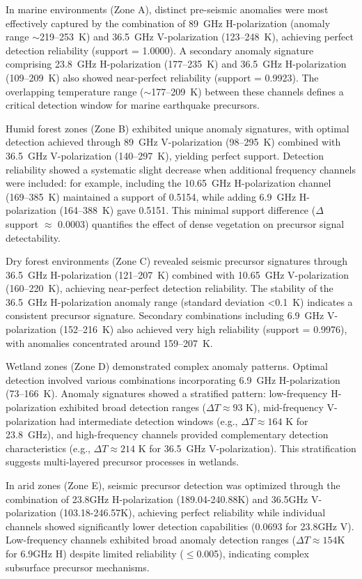 \documentclass[preprint,review,12pt,authoryear]{elsarticle}
\begin{document}
In marine environments (Zone A), distinct pre-seismic anomalies were most effectively captured by the combination of 89~GHz H-polarization (anomaly range $\sim$219--253~K) and 36.5~GHz V-polarization (123--248~K), achieving perfect detection reliability (support = 1.0000). A secondary anomaly signature comprising 23.8~GHz H-polarization (177--235~K) and 36.5~GHz H-polarization (109--209~K) also showed near-perfect reliability (support = 0.9923). The overlapping temperature range ($\sim$177--209~K) between these channels defines a critical detection window for marine earthquake precursors.

Humid forest zones (Zone B) exhibited unique anomaly signatures, with optimal detection achieved through 89~GHz V-polarization (98--295~K) combined with 36.5~GHz V-polarization (140--297~K), yielding perfect support. Detection reliability showed a systematic slight decrease when additional frequency channels were included: for example, including the 10.65~GHz H-polarization channel (169--385~K) maintained a support of 0.5154, while adding 6.9~GHz H-polarization (164--388~K) gave 0.5151. This minimal support difference ($\Delta$support $\approx$ 0.0003) quantifies the effect of dense vegetation on precursor signal detectability.

Dry forest environments (Zone C) revealed seismic precursor signatures through 36.5~GHz H-polarization (121--207~K) combined with 10.65~GHz V-polarization (160--220~K), achieving near-perfect detection reliability. The stability of the 36.5~GHz H-polarization anomaly range (standard deviation <0.1~K) indicates a consistent precursor signature. Secondary combinations including 6.9~GHz V-polarization (152--216~K) also achieved very high reliability (support = 0.9976), with anomalies concentrated around 159--207~K.

Wetland zones (Zone D) demonstrated complex anomaly patterns. Optimal detection involved various combinations incorporating 6.9~GHz H-polarization (73--166~K). Anomaly signatures showed a stratified pattern: low-frequency H-polarization exhibited broad detection ranges ($\Delta T \approx 93$ K), mid-frequency V-polarization had intermediate detection windows (e.g., $\Delta T \approx 164$ K for 23.8~GHz), and high-frequency channels provided complementary detection characteristics (e.g., $\Delta T \approx 214$ K for 36.5~GHz V-polarization). This stratification suggests multi-layered precursor processes in wetlands.

In arid zones (Zone E), seismic precursor detection was optimized through the combination of 23.8GHz H-polarization (189.04-240.88K) and 36.5GHz V-polarization (103.18-246.57K), achieving perfect reliability while individual channels showed significantly lower detection capabilities (0.0693 for 23.8GHz V). Low-frequency channels exhibited broad anomaly detection ranges ($\Delta T \approx 154$K for 6.9GHz H) despite limited reliability ($\le$0.005), indicating complex subsurface precursor mechanisms.
\end{document}
